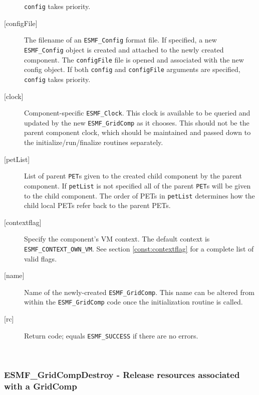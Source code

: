 \begin{description}
     {\tt config} takes priority.
   \item[{[configFile]}]
     The filename of an {\tt ESMF\_Config} format file.
     If specified, a new {\tt ESMF\_Config} object is created and attached to the
     newly created component. The {\tt configFile} file is opened and associated
     with the new config object.
     If both {\tt config} and {\tt configFile} arguments are specified,
     {\tt config} takes priority.
   \item[{[clock]}]
     \begin{sloppypar}
     Component-specific {\tt ESMF\_Clock}.  This clock is available to be
     queried and updated by the new {\tt ESMF\_GridComp} as it chooses.
     This should
     not be the parent component clock, which should be maintained and passed
     down to the initialize/run/finalize routines separately.
     \end{sloppypar}
   \item[{[petList]}]
     List of parent {\tt PET}s given to the created child component by the
     parent component. If {\tt petList} is not specified all of the
     parent {\tt PET}s will be given to the child component. The order of
     PETs in {\tt petList} determines how the child local PETs refer back to
     the parent PETs.
   \item[{[contextflag]}]
     Specify the component's VM context. The default context is
     {\tt ESMF\_CONTEXT\_OWN\_VM}. See section \ref{const:contextflag} for a
     complete list of valid flags.
   \item[{[name]}]
     Name of the newly-created {\tt ESMF\_GridComp}.  This name can be altered
     from within the {\tt ESMF\_GridComp} code once the initialization routine
     is called.
   \item[{[rc]}]
     Return code; equals {\tt ESMF\_SUCCESS} if there are no errors.
   \end{description}
   
 
\mbox{}\hrulefill\ 
 
\subsubsection [ESMF\_GridCompDestroy] {ESMF\_GridCompDestroy - Release resources associated with a GridComp}


